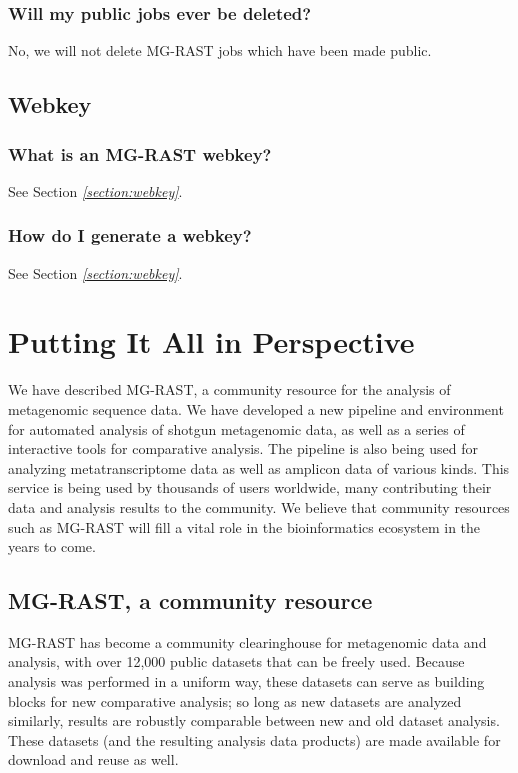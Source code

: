 \documentclass[letterpaper,10pt,english]{sphinxmanual}
\begin{document}
\subsection{Will my public jobs ever be deleted?}
\label{\detokenize{user_manual:will-my-public-jobs-ever-be-deleted}}
No, we will not delete MG-RAST jobs which have been made public.


\section{Webkey}
\label{\detokenize{user_manual:webkey}}

\subsection{What is an MG-RAST webkey?}
\label{\detokenize{user_manual:what-is-an-mg-rast-webkey}}
See Section {\hyperref[\detokenize{user_manual:section:webkey}]{\emph{{[}section:webkey{]}}}}.


\subsection{How do I generate a webkey?}
\label{\detokenize{user_manual:how-do-i-generate-a-webkey}}
See Section {\hyperref[\detokenize{user_manual:section:webkey}]{\emph{{[}section:webkey{]}}}}.


\chapter{Putting It All in Perspective}
\label{\detokenize{user_manual:putting-it-all-in-perspective}}
We have described MG-RAST, a community resource for the analysis of
metagenomic sequence data. We have developed a new pipeline and
environment for automated analysis of shotgun metagenomic data, as well
as a series of interactive tools for comparative analysis. The pipeline
is also being used for analyzing metatranscriptome data as well as
amplicon data of various kinds. This service is being used by thousands
of users worldwide, many contributing their data and analysis results to
the community. We believe that community resources such as MG-RAST will
fill a vital role in the bioinformatics ecosystem in the years to come.


\section{MG-RAST, a community resource}
\label{\detokenize{user_manual:mg-rast-a-community-resource}}
MG-RAST has become a community clearinghouse for metagenomic data and
analysis, with over 12,000 public datasets that can be freely used.
Because analysis was performed in a uniform way, these datasets can
serve as building blocks for new comparative analysis; so long as new
datasets are analyzed similarly, results are robustly comparable between
new and old dataset analysis. These datasets (and the resulting analysis
data products) are made available for download and reuse as well.
\end{document}
